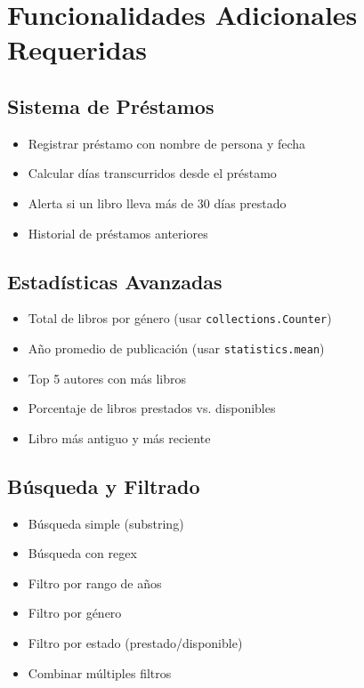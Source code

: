 \documentclass[12pt,a4paper]{article}
\begin{document}
\section{Funcionalidades Adicionales Requeridas}

\subsection{Sistema de Préstamos}
\begin{itemize}[leftmargin=*]
    \item Registrar préstamo con nombre de persona y fecha
    \item Calcular días transcurridos desde el préstamo
    \item Alerta si un libro lleva más de 30 días prestado
    \item Historial de préstamos anteriores
\end{itemize}

\subsection{Estadísticas Avanzadas}
\begin{itemize}[leftmargin=*]
    \item Total de libros por género (usar \texttt{collections.Counter})
    \item Año promedio de publicación (usar \texttt{statistics.mean})
    \item Top 5 autores con más libros
    \item Porcentaje de libros prestados vs. disponibles
    \item Libro más antiguo y más reciente
\end{itemize}

\subsection{Búsqueda y Filtrado}
\begin{itemize}[leftmargin=*]
    \item Búsqueda simple (substring)
    \item Búsqueda con regex
    \item Filtro por rango de años
    \item Filtro por género
    \item Filtro por estado (prestado/disponible)
    \item Combinar múltiples filtros
\end{itemize}
\end{document}
